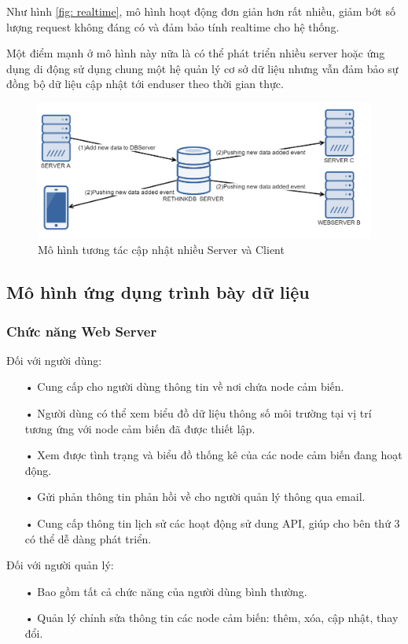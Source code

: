 Như hình \ref{fig: realtime}, mô hình hoạt động đơn giản hơn rất nhiều, giảm bớt số lượng request không đáng có và đảm bảo tính realtime cho hệ thống.

Một điểm mạnh ở mô hình này nữa là có thể phát triển nhiều server hoặc ứng dụng di động sử dụng chung một hệ quản lý cơ sở dữ liệu nhưng vẫn đảm bảo sự đồng bộ dữ liệu cập nhật tới enduser theo thời gian thực.
\begin{figure}[H]
	\centering    
	\includegraphics[width=1.0\textwidth]{multiserver}
	\caption[Mô hình tương tác cập nhật nhiều Server]{Mô hình tương tác cập nhật nhiều Server và Client}
	\label{fig: multiserver}
\end{figure}
\subsection{Mô hình ứng dụng trình bày dữ liệu}
\subsubsection*{Chức năng Web Server}
Đối với người dùng:
\begin{itemize}
\item[•] Cung cấp cho người dùng thông tin về nơi chứa node cảm biến.
\item[•] Người dùng có thể xem biểu đồ dữ liệu thông số môi trường tại vị trí tương ứng với node cảm biến đã được thiết lập.
\item[•] Xem được tình trạng và biểu đồ thống kê của các node cảm biến đang hoạt động.
\item[•] Gửi phản thông tin phản hồi về cho người quản lý thông qua email.
\item[•] Cung cấp thông tin lịch sử các hoạt động sử dung API, giúp cho bên thứ 3 có thể dễ dàng phát triển.
\end{itemize}

Đối với người quản lý:
\begin{itemize}
\item[•] Bao gồm tất cả chức năng của người dùng bình thường.
\item[•] Quản lý chỉnh sửa thông tin các node cảm biến: thêm, xóa, cập nhật, thay đổi.
\end{itemize}

